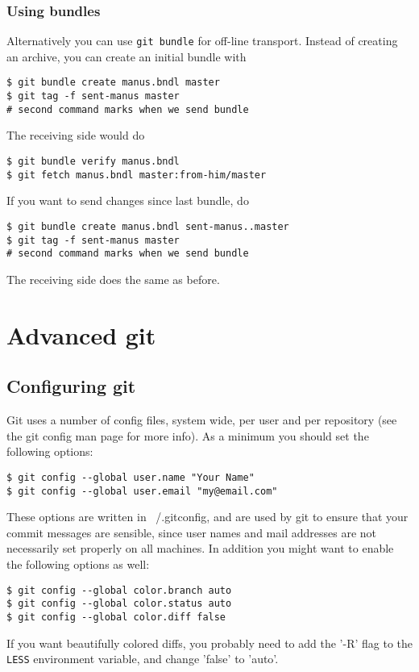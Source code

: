\documentclass[a4paper,10pt]{article}
\begin{document}
\subsubsection{Using bundles}
Alternatively you can use \texttt{git bundle} for off-line
transport. 
Instead of creating an archive, you can create an initial bundle with
\begin{verbatim}
$ git bundle create manus.bndl master
$ git tag -f sent-manus master
# second command marks when we send bundle
\end{verbatim}
The receiving side would do
\begin{verbatim}
$ git bundle verify manus.bndl
$ git fetch manus.bndl master:from-him/master
\end{verbatim}

If you want to send changes since last bundle, do
\begin{verbatim}
$ git bundle create manus.bndl sent-manus..master
$ git tag -f sent-manus master
# second command marks when we send bundle
\end{verbatim}
The receiving side does the same as before.

\section{Advanced git}
\subsection{Configuring git}
Git uses a number of config files, system
wide, per user and per repository (see the git config man page for more info).
As a minimum you should set the following options:
\begin{verbatim}
$ git config --global user.name "Your Name"
$ git config --global user.email "my@email.com"
\end{verbatim}
These options are written in ~/.gitconfig, and are used by git to ensure that
your commit messages are sensible, since user names and mail addresses are not
necessarily set properly on all machines. In addition you might want to enable
the following options as well:
\begin{verbatim}
$ git config --global color.branch auto
$ git config --global color.status auto
$ git config --global color.diff false
\end{verbatim}
If you want beautifully colored diffs, you probably need to add the '-R' flag
to the \texttt{LESS} environment variable, and change 'false' to 'auto'.
\end{document}
